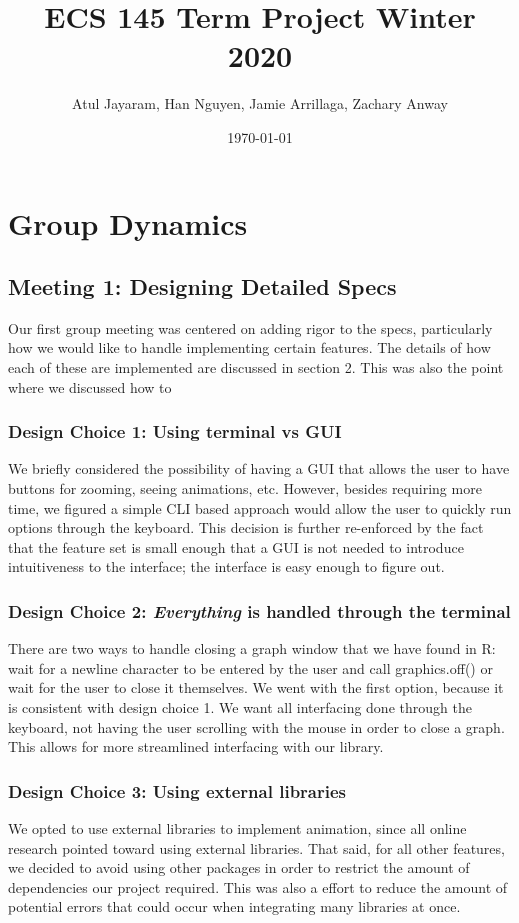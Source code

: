 \documentclass{article}
\title{ECS 145 Term Project Winter 2020}
\author{Atul Jayaram, Han Nguyen, Jamie Arrillaga, Zachary Anway}
\date{\today}
\begin{document}
\maketitle

\newpage
\tableofcontents
\newpage

\section{Group Dynamics}
\subsection{Meeting 1: Designing Detailed Specs}
Our first group meeting was centered on adding rigor to the specs, particularly how we would like to handle implementing certain features. The details of how each of these are implemented are discussed in section 2. This was also the point where we discussed how to
\subsubsection{Design Choice 1: Using terminal vs GUI}
We briefly considered the possibility of having a GUI that allows the user to have buttons for zooming, seeing animations, etc. However, besides requiring more time, we figured a simple CLI based approach would allow the user to quickly run options through the keyboard. This decision is further re-enforced by the fact that the feature set is small enough that a GUI is not needed to introduce intuitiveness to the interface; the interface is easy enough to figure out.
\subsubsection{Design Choice 2: \textit{Everything} is handled through the terminal}
There are two ways to handle closing a graph window that we have found in R: wait for a newline character to be entered by the user and call graphics.off() or wait for the user to close it themselves. We went with the first option, because it is consistent with design choice 1. We want all interfacing done through the keyboard, not having the user scrolling with the mouse in order to close a graph. This allows for more streamlined interfacing with our library.
\subsubsection{Design Choice 3: Using external libraries}
We opted to use external libraries to implement animation, since all online research pointed toward using external libraries. That said, for all other features, we decided to avoid using other packages in order to restrict the amount of dependencies our project required. This was also a effort to reduce the amount of potential errors that could occur when integrating many libraries at once.
\end{document}
